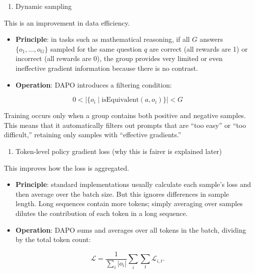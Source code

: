 \begin{enumerate}
\def\labelenumi{\arabic{enumi}.}
\setcounter{enumi}{1}
\tightlist
\item
  Dynamic sampling
\end{enumerate}

This is an improvement in data efficiency.

\begin{itemize}
\tightlist
\item
  \textbf{Principle}: in tasks such as mathematical reasoning, if all \(G\) answers \(\{o_1,\ldots,o_G\}\) sampled for the same question \(q\) are correct (all rewards are 1) or incorrect (all rewards are 0), the group provides very limited or even ineffective gradient information because there is no contrast.
\item
{}
  \textbf{Operation}: DAPO introduces a filtering condition:
\end{itemize}

\[
0 < \left|\{o_i \mid \mathrm{isEquivalent}(a,o_i)\}\right| < G
\]

Training occurs only when a group contains both positive and negative samples. This means that it automatically filters out prompts that are ``too easy'' or ``too difficult,'' retaining only samples with ``effective gradients.''

\begin{enumerate}
\def\labelenumi{\arabic{enumi}.}
\setcounter{enumi}{2}
\tightlist
\item
  Token-level policy gradient loss (why this is fairer is explained later)
\end{enumerate}

This improves how the loss is aggregated.

\begin{itemize}
\tightlist
\item
  \textbf{Principle}: standard implementations usually calculate each sample's loss and then average over the batch size. But this ignores differences in sample length. Long sequences contain more tokens; simply averaging over samples dilutes the contribution of each token in a long sequence.
\item
{}
  \textbf{Operation}: DAPO sums and averages over all tokens in the batch, dividing by the total token count:
\end{itemize}

\[
\mathcal{L}
=
\frac{1}{\sum_i |o_i|}
\sum_i \sum_t \mathcal{L}_{i,t}.
\]

